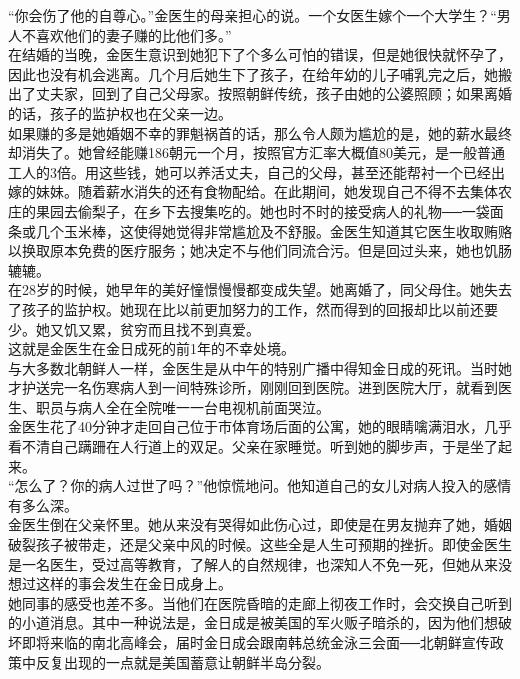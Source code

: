 \begin{multicols}{\theparacolNo}
“你会伤了他的自尊心。”金医生的母亲担心的说。一个女医生嫁个一个大学生？“男人不喜欢他们的妻子赚的比他们多。”\\

在结婚的当晚，金医生意识到她犯下了个多么可怕的错误，但是她很快就怀孕了，因此也没有机会逃离。几个月后她生下了孩子，在给年幼的儿子哺乳完之后，她搬出了丈夫家，回到了自己父母家。按照朝鲜传统，孩子由她的公婆照顾；如果离婚的话，孩子的监护权也在父亲一边。\\

如果赚的多是她婚姻不幸的罪魁祸首的话，那么令人颇为尴尬的是，她的薪水最终却消失了。她曾经能赚186朝元一个月，按照官方汇率大概值80美元，是一般普通工人的3倍。用这些钱，她可以养活丈夫，自己的父母，甚至还能帮衬一个已经出嫁的妹妹。随着薪水消失的还有食物配给。在此期间，她发现自己不得不去集体农庄的果园去偷梨子，在乡下去搜集吃的。她也时不时的接受病人的礼物──一袋面条或几个玉米棒，这使得她觉得非常尴尬及不舒服。金医生知道其它医生收取贿赂以换取原本免费的医疗服务；她决定不与他们同流合污。但是回过头来，她也饥肠辘辘。\\

在28岁的时候，她早年的美好憧憬慢慢都变成失望。她离婚了，同父母住。她失去了孩子的监护权。她现在比以前更加努力的工作，然而得到的回报却比以前还要少。她又饥又累，贫穷而且找不到真爱。\\

这就是金医生在金日成死的前1年的不幸处境。\\

与大多数北朝鲜人一样，金医生是从中午的特别广播中得知金日成的死讯。当时她才护送完一名伤寒病人到一间特殊诊所，刚刚回到医院。进到医院大厅，就看到医生、职员与病人全在全院唯一一台电视机前面哭泣。\\

金医生花了40分钟才走回自己位于市体育场后面的公寓，她的眼睛噙满泪水，几乎看不清自己蹒跚在人行道上的双足。父亲在家睡觉。听到她的脚步声，于是坐了起来。\\

“怎么了？你的病人过世了吗？”他惊慌地问。他知道自己的女儿对病人投入的感情有多么深。\\

金医生倒在父亲怀里。她从来没有哭得如此伤心过，即使是在男友抛弃了她，婚姻破裂孩子被带走，还是父亲中风的时候。这些全是人生可预期的挫折。即使金医生是一名医生，受过高等教育，了解人的自然规律，也深知人不免一死，但她从来没想过这样的事会发生在金日成身上。\\

她同事的感受也差不多。当他们在医院昏暗的走廊上彻夜工作时，会交换自己听到的小道消息。其中一种说法是，金日成是被美国的军火贩子暗杀的，因为他们想破坏即将来临的南北高峰会，届时金日成会跟南韩总统金泳三会面──北朝鲜宣传政策中反复出现的一点就是美国蓄意让朝鲜半岛分裂。\\


\end{multicols}

